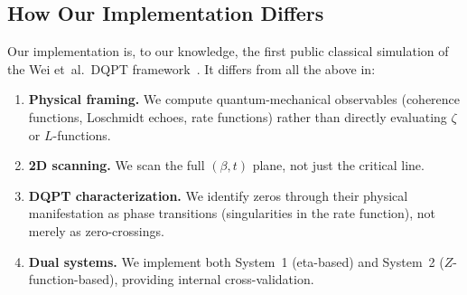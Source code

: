 \subsection{How Our Implementation Differs}
\label{sec:novelty}

Our implementation is, to our knowledge, the first public classical simulation of the
Wei et~al.\ DQPT framework~\cite{wei2025}. It differs from all the above in:
\begin{enumerate}
  \item \textbf{Physical framing.} We compute quantum-mechanical observables (coherence
        functions, Loschmidt echoes, rate functions) rather than directly evaluating
        $\zeta$ or $L$-functions.
  \item \textbf{2D scanning.} We scan the full $(\beta, t)$ plane, not just the critical
        line.
  \item \textbf{DQPT characterization.} We identify zeros through their physical
        manifestation as phase transitions (singularities in the rate function), not
        merely as zero-crossings.
  \item \textbf{Dual systems.} We implement both System~1 (eta-based) and System~2
        ($Z$-function-based), providing internal cross-validation.
\end{enumerate}

